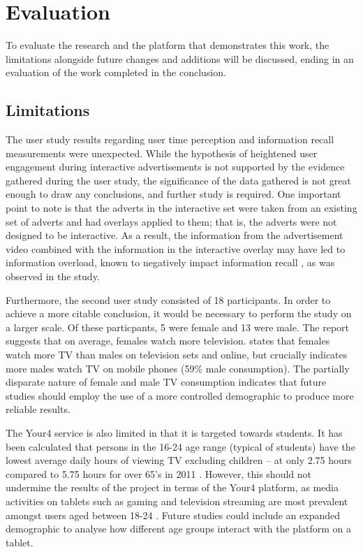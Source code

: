\section{Evaluation}
	To evaluate the research and the platform that demonstrates this work, the limitations alongside future changes and additions will be discussed, ending in an evaluation of the work completed in the conclusion.
	\subsection{Limitations}

	The user study results regarding user time perception and information recall measurements were unexpected. While the hypothesis of heightened user engagement during interactive advertisements is not supported by the evidence gathered during the user study, the significance of the data gathered is not great enough to draw any conclusions, and further study is required. One important point to note is that the adverts in the interactive set were taken from an existing set of adverts and had overlays applied to them; that is, the adverts were not designed to be interactive. As a result, the information from the advertisement video combined with the information in the interactive overlay may have led to information overload, known to negatively impact information recall \cite{divided_attention}, as was observed in the study.


	Furthermore, the second user study consisted of 18 participants. In order to achieve a more citable conclusion, it would be necessary to perform the study on a larger scale. Of these particpants, 5 were female and 13 were male. The \citet{barb-trends} report suggests that on average, females watch more television. \citet{three-screen} states that females watch more TV than males on television sets and online, but crucially indicates more males watch TV on mobile phones (59\% male consumption). The partially disparate nature of female and male TV consumption indicates that future studies should employ the use of a more controlled demographic to produce more reliable results.

	The Your4 service is also limited in that it is targeted towards students. It has been calculated that persons in the 16-24 age range (typical of students) have the lowest average daily hours of viewing TV excluding children -- at only 2.75 hours compared to 5.75 hours for over 65's in 2011 \citep{barb-trends}. However, this should not undermine the results of the project in terms of the Your4 platform, as media activities on tablets such as gaming and television streaming are most prevalent amongst users aged between 18-24 \citep{viacom}. Future studies could include an expanded demographic to analyse how different age groups interact with the platform on a tablet.

